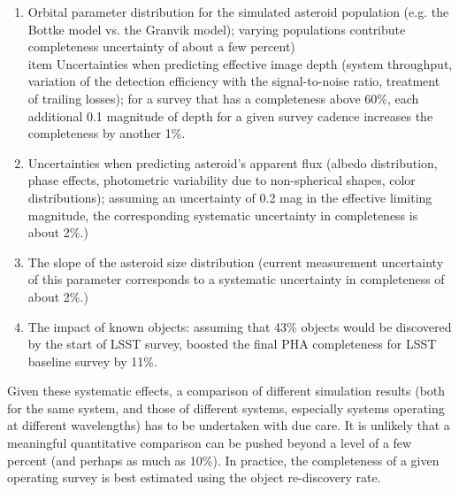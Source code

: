 \begin{enumerate}
\item Orbital parameter distribution for the simulated asteroid population (e.g. the Bottke model
             vs. the Granvik model); varying populations contribute completeness uncertainty of about a few percent) 
\\item Uncertainties when predicting effective image depth (system throughput, variation of the detection efficiency
          with the signal-to-noise ratio, treatment of trailing losses); for a survey that has a completeness above 60\%, 
          each additional 0.1 magnitude of depth for a given survey cadence increases the completeness by another 1\%.
\item Uncertainties when predicting asteroid's apparent flux (albedo distribution, phase effects, photometric variability 
          due to non-spherical shapes, color distributions); assuming an uncertainty of 0.2 mag in the effective 
          limiting magnitude, the corresponding  systematic uncertainty in completeness is about 2\%.)
\item The slope of the asteroid size distribution (current measurement uncertainty of this parameter 
          corresponds to a systematic uncertainty in completeness of about 2\%.)
\item The impact of known objects: assuming that 43\% objects would be discovered by the start of
          LSST survey, \cite{GMS2016} boosted the final PHA completeness for LSST baseline survey by 11\%. 
\end{enumerate} 

Given these systematic effects, a comparison of different simulation results (both for the same system,
and those of different systems, especially systems operating at different wavelengths) has to be undertaken
with due care. It is unlikely that a meaningful quantitative comparison can be pushed beyond a level
of a few percent (and perhaps as much as 10\%). In practice, the completeness of a given operating survey
is best estimated using the object re-discovery rate. 

